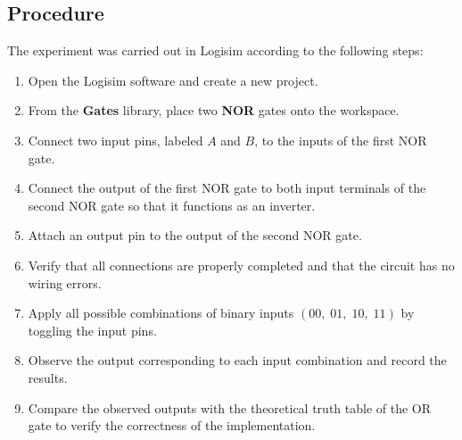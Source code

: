 \documentclass[12pt,a4paper]{article}
\begin{document}

\subsection{Procedure}

The experiment was carried out in Logisim according to the following steps:

\begin{enumerate}
    \item Open the Logisim software and create a new project.

    \item From the \textbf{Gates} library, place two \textbf{NOR} gates onto the workspace.

    \item Connect two input pins, labeled $A$ and $B$, to the inputs of the first NOR gate.

    \item Connect the output of the first NOR gate to both input terminals of the second NOR gate so that it functions as an inverter.

    \item Attach an output pin to the output of the second NOR gate.

    \item Verify that all connections are properly completed and that the circuit has no wiring errors.

    \item Apply all possible combinations of binary inputs $(00,\;01,\;10,\;11)$ by toggling the input pins.

    \item Observe the output corresponding to each input combination and record the results.

    \item Compare the observed outputs with the theoretical truth table of the OR gate to verify the correctness of the implementation.
\end{enumerate}









\end{document}
